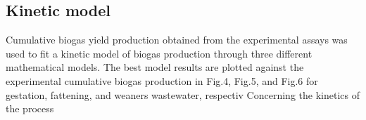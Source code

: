 \subsection{Kinetic model}
Cumulative biogas yield production obtained from the experimental assays was used to fit a kinetic model of biogas production through three different mathematical models. The best model results are plotted against the experimental cumulative biogas production in Fig.4, Fig.5, and Fig.6 for gestation, fattening, and weaners wastewater, respectiv
Concerning the kinetics of the process